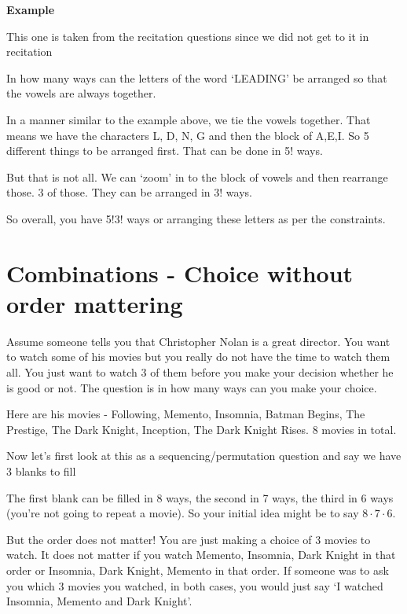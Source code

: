 \documentclass[12pt]{article}
\begin{document}
\medskip

\textbf{Example}

This one is taken from the recitation questions since we did not get to it in recitation

In how many ways can the letters of the word `LEADING' be arranged so that the vowels are always together.

In a manner similar to the example above, we tie the vowels together. That means we have the characters L, D, N, G and then the block of A,E,I. So 5 different things to be arranged first. 
That can be done in 5! ways. 

But that is not all. We can `zoom' in to the block of vowels and then rearrange those. 3 of those. They can be arranged in 3! ways.

So overall, you have 5!3! ways or arranging these letters as per the constraints.

\section*{Combinations - Choice without order mattering}

Assume someone tells you that Christopher Nolan is a great director. You want to watch some of his movies but you really do not have the time to watch them all. You just want to watch 3 of them before you make your decision whether he is good or not. The question is in how many ways can you make your choice.

Here are his movies - {Following, Memento, Insomnia, Batman Begins, The Prestige, The Dark Knight, Inception, The Dark Knight Rises}. 8 movies in total.

Now let's first look at this as a sequencing/permutation question and say we have 3 blanks to fill 

\underline{{\hspace{2cm}}} \hspace{0.5cm } \underline{{\hspace{2cm}}} \hspace{0.5cm} \underline{{\hspace{2cm}}} 

\vspace{1cm}

The first blank can be filled in 8 ways, the second in 7 ways, the third in 6 ways (you're not going to repeat a movie). So your initial idea might be to say $8 \cdot 7 \cdot 6$.

But the order does not matter! You are just making a choice of 3 movies to watch. It does not matter if you watch Memento, Insomnia, Dark Knight in that order or Insomnia, Dark Knight, Memento in that order. If someone was to ask you which 3 movies you watched, in both cases, you would just say `I watched Insomnia, Memento and Dark Knight'.
\end{document}
